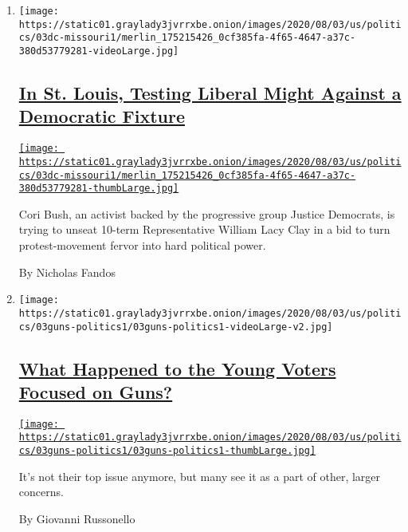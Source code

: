 \begin{enumerate}
\def\labelenumi{\arabic{enumi}.}
\item
  \texttt{[image: https://static01.graylady3jvrrxbe.onion/images/2020/08/03/us/politics/03dc-missouri1/merlin\_175215426\_0cf385fa-4f65-4647-a37c-380d53779281-videoLarge.jpg]}

  \hypertarget{in-st-louis-testing-liberal-might-against-a-democratic-fixture}{%
  \subsection{\texorpdfstring{\href{/2020/08/02/us/politics/cori-bush-william-lacy-clay-missouri.html}{In
  St. Louis, Testing Liberal Might Against a Democratic
  Fixture}}{In St. Louis, Testing Liberal Might Against a Democratic Fixture}}\label{in-st-louis-testing-liberal-might-against-a-democratic-fixture}}

  \href{/2020/08/02/us/politics/cori-bush-william-lacy-clay-missouri.html}{\texttt{[image: https://static01.graylady3jvrrxbe.onion/images/2020/08/03/us/politics/03dc-missouri1/merlin\_175215426\_0cf385fa-4f65-4647-a37c-380d53779281-thumbLarge.jpg]}}

  Cori Bush, an activist backed by the progressive group Justice
  Democrats, is trying to unseat 10-term Representative William Lacy
  Clay in a bid to turn protest-movement fervor into hard political
  power.

  By Nicholas Fandos
\item
  \texttt{[image: https://static01.graylady3jvrrxbe.onion/images/2020/08/03/us/politics/03guns-politics1/03guns-politics1-videoLarge-v2.jpg]}

  \hypertarget{what-happened-to-the-young-voters-focused-on-guns}{%
  \subsection{\texorpdfstring{\href{/2020/08/03/us/politics/gun-control-voters.html}{What
  Happened to the Young Voters Focused on
  Guns?}}{What Happened to the Young Voters Focused on Guns?}}\label{what-happened-to-the-young-voters-focused-on-guns}}

  \href{/2020/08/03/us/politics/gun-control-voters.html}{\texttt{[image: https://static01.graylady3jvrrxbe.onion/images/2020/08/03/us/politics/03guns-politics1/03guns-politics1-thumbLarge.jpg]}}

  It's not their top issue anymore, but many see it as a part of other,
  larger concerns.

  By Giovanni Russonello
\end{enumerate}

